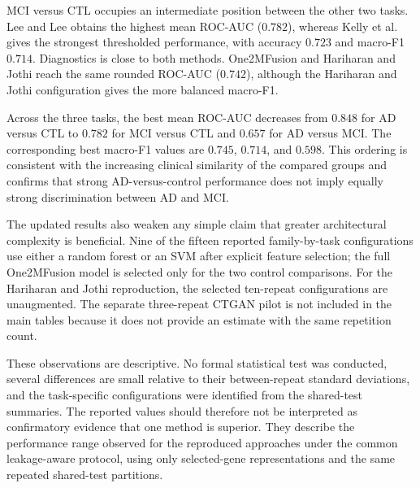 MCI versus CTL occupies an intermediate position between the other two tasks. Lee and Lee obtains the highest mean ROC-AUC (\(0.782\)), whereas Kelly et al. gives the strongest thresholded performance, with accuracy \(0.723\) and macro-F1 \(0.714\). Diagnostics is close to both methods. One2MFusion and Hariharan and Jothi reach the same rounded ROC-AUC (\(0.742\)), although the Hariharan and Jothi configuration gives the more balanced macro-F1.

\medskip
Across the three tasks, the best mean ROC-AUC decreases from \(0.848\) for AD versus CTL to \(0.782\) for MCI versus CTL and \(0.657\) for AD versus MCI. The corresponding best macro-F1 values are \(0.745\), \(0.714\), and \(0.598\). This ordering is consistent with the increasing clinical similarity of the compared groups and confirms that strong AD-versus-control performance does not imply equally strong discrimination between AD and MCI.

The updated results also weaken any simple claim that greater architectural complexity is beneficial. Nine of the fifteen reported family-by-task configurations use either a random forest or an SVM after explicit feature selection; the full One2MFusion model is selected only for the two control comparisons. For the Hariharan and Jothi reproduction, the selected ten-repeat configurations are unaugmented. The separate three-repeat CTGAN pilot is not included in the main tables because it does not provide an estimate with the same repetition count.

These observations are descriptive. No formal statistical test was conducted, several differences are small relative to their between-repeat standard deviations, and the task-specific configurations were identified from the shared-test summaries. The reported values should therefore not be interpreted as confirmatory evidence that one method is superior. They describe the performance range observed for the reproduced approaches under the common leakage-aware protocol, using only selected-gene representations and the same repeated shared-test partitions.
